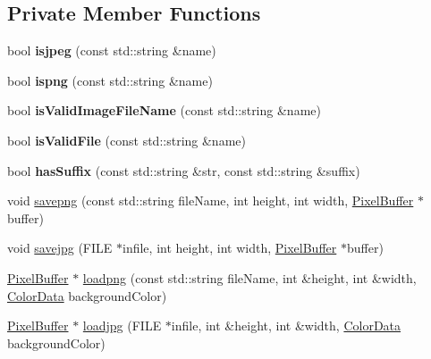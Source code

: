 \subsection*{Private Member Functions}
\begin{DoxyCompactItemize}
\item 
\hypertarget{classImageHandler_acab3c475db0bafa4962e1c368c6c8dab}{bool {\bfseries isjpeg} (const std\-::string \&name)}\label{classImageHandler_acab3c475db0bafa4962e1c368c6c8dab}

\item 
\hypertarget{classImageHandler_a7b60eda1f737592ee903b184210b3b36}{bool {\bfseries ispng} (const std\-::string \&name)}\label{classImageHandler_a7b60eda1f737592ee903b184210b3b36}

\item 
\hypertarget{classImageHandler_a1e2f52b22c7db4f272e715ce41cfb50f}{bool {\bfseries is\-Valid\-Image\-File\-Name} (const std\-::string \&name)}\label{classImageHandler_a1e2f52b22c7db4f272e715ce41cfb50f}

\item 
\hypertarget{classImageHandler_a156a3bd0b6a5381a62863af5d21cf346}{bool {\bfseries is\-Valid\-File} (const std\-::string \&name)}\label{classImageHandler_a156a3bd0b6a5381a62863af5d21cf346}

\item 
\hypertarget{classImageHandler_a00a0f953ebe114ef1925ddafef149354}{bool {\bfseries has\-Suffix} (const std\-::string \&str, const std\-::string \&suffix)}\label{classImageHandler_a00a0f953ebe114ef1925ddafef149354}

\item 
void \hyperlink{classImageHandler_afa5073aef96331be8b7c3e8fe8fbd373}{savepng} (const std\-::string file\-Name, int height, int width, \hyperlink{classPixelBuffer}{Pixel\-Buffer} $\ast$buffer)
\item 
void \hyperlink{classImageHandler_a93c1210df4b0b9d673e3ba99f1452d60}{savejpg} (F\-I\-L\-E $\ast$infile, int height, int width, \hyperlink{classPixelBuffer}{Pixel\-Buffer} $\ast$buffer)
\item 
\hyperlink{classPixelBuffer}{Pixel\-Buffer} $\ast$ \hyperlink{classImageHandler_a0812c8e895f28203138d8e67f3be2418}{loadpng} (const std\-::string file\-Name, int \&height, int \&width, \hyperlink{classColorData}{Color\-Data} background\-Color)
\item 
\hyperlink{classPixelBuffer}{Pixel\-Buffer} $\ast$ \hyperlink{classImageHandler_a84ff67cb9c77f69cf3a66bdcd4e3f977}{loadjpg} (F\-I\-L\-E $\ast$infile, int \&height, int \&width, \hyperlink{classColorData}{Color\-Data} background\-Color)
\end{DoxyCompactItemize}


